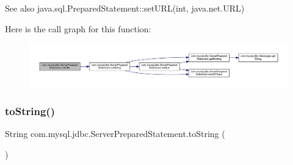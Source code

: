 \begin{DoxySeeAlso}{See also}
java.\+sql.\+Prepared\+Statement\+::set\+U\+RL(int, java.\+net.\+U\+RL) 
\end{DoxySeeAlso}
Here is the call graph for this function\+:
\nopagebreak
\begin{figure}[H]
\begin{center}
\leavevmode
\includegraphics[width=350pt]{classcom_1_1mysql_1_1jdbc_1_1_server_prepared_statement_aa1b307d5296eda6944ce2526ba8cea37_cgraph}
\end{center}
\end{figure}
\mbox{\label{classcom_1_1mysql_1_1jdbc_1_1_server_prepared_statement_adbcd3a8f7f7d1d7408d97df3f1318a3d}} 
\subsubsection{\texorpdfstring{to\+String()}{toString()}}
{\footnotesize\ttfamily String com.\+mysql.\+jdbc.\+Server\+Prepared\+Statement.\+to\+String (\begin{DoxyParamCaption}{ }\end{DoxyParamCaption})}

